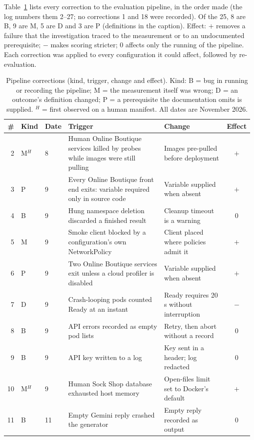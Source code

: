 \documentclass[a4paper,fleqn]{cas-dc}
\begin{document}
Table~\ref{tab:fixes} lists every correction to the evaluation pipeline, in the order made (the log numbers them 2--27; no corrections 1 and 18 were recorded). Of the 25, 8 are B, 9 are M, 5 are D and 3 are P (definitions in the caption). Effect: $+$ removes a failure that the investigation traced to the measurement or to an undocumented prerequisite; $-$ makes scoring stricter; 0 affects only the running of the pipeline. Each correction was applied to every configuration it could affect, followed by re-evaluation.

\begin{table}[t]
\centering\footnotesize
\caption{Pipeline corrections (kind, trigger, change and effect). Kind: B = bug in running or recording the pipeline; M = the measurement itself was wrong; D = an outcome's definition changed; P = a prerequisite the documentation omits is supplied. $^{H}$ = first observed on a human manifest. All dates are November 2026.}\label{tab:fixes}
\begin{tabular}{rllp{}p{}c}
\toprule
\# & Kind & Date & Trigger & Change & Effect \\ \midrule
2 & M$^{H}$ & 8 & Human Online Boutique services killed by probes while images were still pulling & Images pre-pulled before deployment & $+$ \\
3 & P & 9 & Every Online Boutique front end exits: variable required only in source code & Variable supplied when absent & $+$ \\
4 & B & 9 & Hung namespace deletion discarded a finished result & Cleanup timeout is a warning & 0 \\
5 & M & 9 & Smoke client blocked by a configuration's own NetworkPolicy & Client placed where policies admit it & $+$ \\
6 & P & 9 & Two Online Boutique services exit unless a cloud profiler is disabled & Variable supplied when absent & $+$ \\
7 & D & 9 & Crash-looping pods counted Ready at an instant & Ready requires 20 s without interruption & $-$ \\
8 & B & 9 & API errors recorded as empty pod lists & Retry, then abort without a record & 0 \\
9 & B & 9 & API key written to a log & Key sent in a header; log redacted & 0 \\
10 & M$^{H}$ & 9 & Human Sock Shop database exhausted host memory & Open-files limit set to Docker's default & $+$ \\
11 & B & 11 & Empty Gemini reply crashed the generator & Empty reply recorded as output & 0 \\

\end{tabular}
\end{table}
\end{document}
